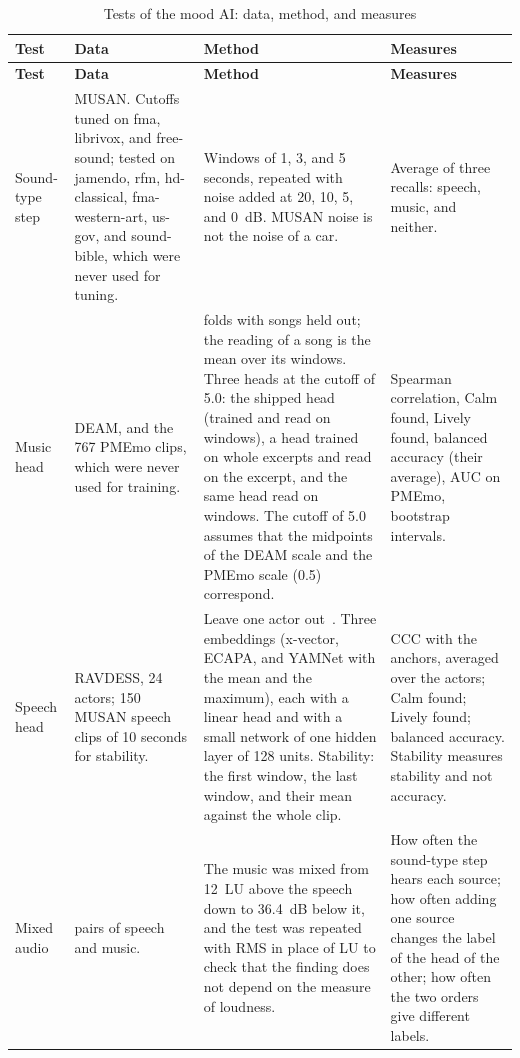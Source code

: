 {
\small
\setlength{\tabcolsep}{4pt}
\renewcommand{\arraystretch}{1.2}
\begin{longtable}{|>{\raggedright\arraybackslash}p{}|>{\raggedright\arraybackslash}p{}|>{\raggedright\arraybackslash}p{}|>{\raggedright\arraybackslash}p{}|}
\caption{Tests of the mood AI: data, method, and measures}\label{tab:ai-tests}\\
\hline
\textbf{Test} & \textbf{Data} & \textbf{Method} & \textbf{Measures} \\
\hline
\endfirsthead
\hline
\textbf{Test} & \textbf{Data} & \textbf{Method} & \textbf{Measures} \\
\hline
\endhead
\endfoot
Sound-type step & MUSAN. Cutoffs tuned on fma, librivox, and free-sound; tested on jamendo, rfm, hd-classical, fma-western-art, us-gov, and sound-bible, which were never used for tuning. & Windows of 1, 3, and 5 seconds, repeated with noise added at 20, 10, 5, and 0~dB. MUSAN noise is not the noise of a car. & Average of three recalls: speech, music, and neither. \\
\hline
Music head & DEAM, and the 767 PMEmo clips, which were never used for training. & 10 folds with songs held out; the reading of a song is the mean over its windows. Three heads at the cutoff of 5.0: the shipped head (trained and read on windows), a head trained on whole excerpts and read on the excerpt, and the same head read on windows. The cutoff of 5.0 assumes that the midpoints of the DEAM scale and the PMEmo scale (0.5) correspond. & Spearman correlation, Calm found, Lively found, balanced accuracy (their average), AUC on PMEmo, bootstrap intervals. \\
\hline
Speech head & RAVDESS, 24 actors; 150 MUSAN speech clips of 10 seconds for stability. & Leave one actor out~\cite{antoniou2023speech}. Three embeddings (x-vector, ECAPA, and YAMNet with the mean and the maximum), each with a linear head and with a small network of one hidden layer of 128 units. Stability: the first window, the last window, and their mean against the whole clip. & CCC with the anchors, averaged over the actors; Calm found; Lively found; balanced accuracy. Stability measures stability and not accuracy. \\
\hline
Mixed audio & 150 pairs of speech and music. & The music was mixed from 12~LU above the speech down to 36.4~dB below it, and the test was repeated with RMS in place of LU to check that the finding does not depend on the measure of loudness. & How often the sound-type step hears each source; how often adding one source changes the label of the head of the other; how often the two orders give different labels. \\

\end{longtable}}
